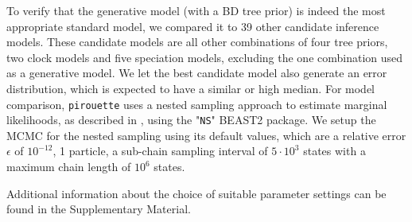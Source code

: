 To verify that the generative model (with a BD tree prior) is indeed the most appropriate standard model, we compared it to 39 other candidate inference models.
These candidate models are all other combinations of four tree priors, two clock models and five speciation models, excluding the one combination used as a generative model.
We let the best candidate model also generate an error distribution, which is expected to have a similar or high median. 
For model comparison, \verb;pirouette; uses a nested sampling approach to estimate marginal likelihoods, as described in \citet{russel2019model}, using the "\verb;NS;" BEAST2 package. We setup the MCMC for the nested sampling using its default values, which are a relative error $\epsilon$ of $10^{-12}$, 
1 particle, a sub-chain sampling interval of $5 \cdot 10^3$ states with a maximum chain length of $10^6$ states.

Additional information about the choice of suitable parameter settings can be found in the Supplementary Material.
\iffalse
\giovanni{This could be put in the appendix, if we manage to put in a handy format.}
We searched through parameter space until these criteria were met.
All the parameter settings used in the pilot experiments can be found at 
\url{https://github.com/richelbilderbeek/razzo_project/blob/master/overview.md}.
Due to the low number of replicates, we were unable (nor tried)
to draw conclusions based on the results.
\fi
